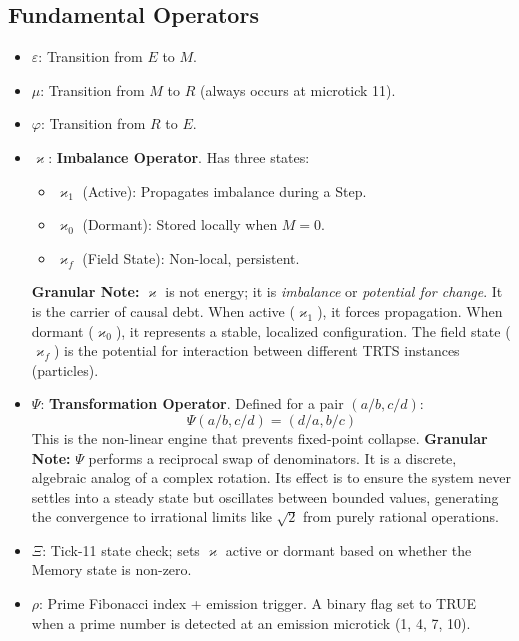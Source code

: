 \documentclass[12pt]{article}
\begin{document}
\subsection{Fundamental Operators}
\begin{itemize}
    \item $\varepsilon$: Transition from $E$ to $M$.
    \item $\mu$: Transition from $M$ to $R$ (always occurs at microtick 11).
    \item $\varphi$: Transition from $R$ to $E$.
    \item $\varkappa$: \textbf{Imbalance Operator}. Has three states:
        \begin{itemize}
            \item $\varkappa_1$ (Active): Propagates imbalance during a Step.
            \item $\varkappa_0$ (Dormant): Stored locally when $M = 0$.
            \item $\varkappa_f$ (Field State): Non-local, persistent.
        \end{itemize}
    \textbf{Granular Note:} $\varkappa$ is not energy; it is \textit{imbalance} or \textit{potential for change}. It is the carrier of causal debt. When active ($\varkappa_1$), it forces propagation. When dormant ($\varkappa_0$), it represents a stable, localized configuration. The field state ($\varkappa_f$) is the potential for interaction between different TRTS instances (particles).
    \item $\Psi$: \textbf{Transformation Operator}. Defined for a pair $(a/b, c/d)$:
        \[
        \Psi(a/b, c/d) = (d/a, b/c)
        \]
        This is the non-linear engine that prevents fixed-point collapse.
        \textbf{Granular Note:} $\Psi$ performs a reciprocal swap of denominators. It is a discrete, algebraic analog of a complex rotation. Its effect is to ensure the system never settles into a steady state but oscillates between bounded values, generating the convergence to irrational limits like $\sqrt{2}$ from purely rational operations.
    \item $\Xi$: Tick-11 state check; sets $\varkappa$ active or dormant based on whether the Memory state is non-zero.
    \item $\rho$: Prime Fibonacci index + emission trigger. A binary flag set to TRUE when a prime number is detected at an emission microtick (1, 4, 7, 10).
\end{itemize}
\end{document}
